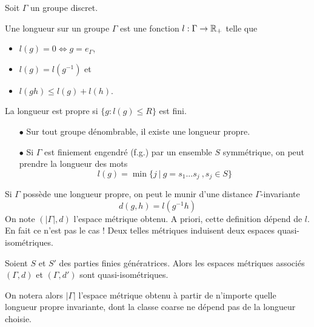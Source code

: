 \documentclass{beamer}
\begin{document}
\begin{frame}
Soit $\Gamma$ un groupe discret.\\
\begin{definition}
Une longueur sur un groupe $\Gamma$ est une fonction $l:\Gamma\rightarrow \mathbb R_+$ telle que 
\begin{itemize}
\item $l(g)=0 \Leftrightarrow g=e_\Gamma$, 
\item $l(g)=l(g^{-1})$ et 
\item $l(gh)\leq l(g)+l(h)$. 
\end{itemize}
La longueur est propre si $\{g : l(g)\leq R\}$ est fini. 
\end{definition}
\begin{itemize}
\item[$\bullet$] Sur tout groupe dénombrable, il existe une longueur propre.
\item[$\bullet$] Si $\Gamma$ est finiement engendré (f.g.) par un ensemble $S$ symmétrique, on peut prendre la longueur des mots
\[l(g) = \min \{j \ |\ g=s_1 ...s_j \ , s_j\in S\}\] 
\end{itemize}
\end{frame}

\begin{frame}
Si $\Gamma$ possède une longueur propre, on peut le munir d'une distance $\Gamma$-invariante 
\[d(g,h)=l(g^{-1}h)\]
On note $(|\Gamma|,d)$ l'espace métrique obtenu. A priori, cette definition dépend de $l$. En fait ce n'est pas le cas ! Deux telles métriques induisent deux espaces quasi-isométriques.
\begin{thm}
Soient $S$ et $S'$ des parties finies génératrices. Alors les espaces métriques associés $(\Gamma,d)$ et $(\Gamma,d')$ sont quasi-isométriques.
\end{thm}

On notera alors $|\Gamma|$ l'espace métrique obtenu à partir de n'importe quelle longueur propre invariante, dont la classe coarse ne dépend pas de la longueur choisie.
\end{frame}
\end{document}
